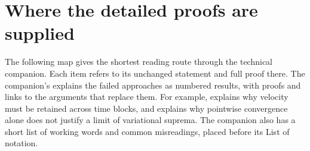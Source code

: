 \section{Where the detailed proofs are supplied}\label{S:reader-map}

The following map gives the shortest reading route through the technical
companion. Each item refers to its unchanged statement and full proof there.
The companion's  explains the failed approaches
as numbered results, with proofs and links to the arguments that replace them.
For example,  explains why velocity must be retained
across time blocks, and  explains why pointwise
convergence alone does not justify a limit of variational suprema. The companion
also has a short list of working words and common misreadings, placed before
its List of notation.

